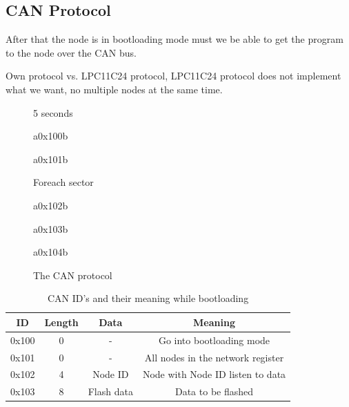 \documentclass[twocolumn]{article}
\begin{document}
	
	\subsection*{CAN Protocol}
		After that the node is in bootloading mode must we be able to get the program to the node over the CAN bus.
		
		
		Own protocol vs. LPC11C24 protocol, LPC11C24 protocol does not implement what we want, no multiple nodes at the same time.
		\begin{figure}[h]
			\centering
			\begin{sequencediagram}
				
				\begin{sdloop}{5 seconds}
					\begin{call}{a}{0x100}{b}{}
					\end{call}
				\end{sdloop}
				
				\begin{call}{a}{0x101}{b}{}
				\end{call}
				
				\begin{sdloop}{Foreach sector}
					\begin{call}{a}{0x102}{b}{} %
					\end{call}
				\end{sdloop}
				\begin{call}{a}{0x103}{b}{} %
				\end{call}
				\begin{call}{a}{0x104}{b}{} %
				\end{call}
				
				
			\end{sequencediagram}
			\caption{The CAN protocol}
		\end{figure}
		
		\begin{table}[ht]
			\caption{CAN ID's and their meaning while bootloading}
			
			\centering
			\begin{tabular}{|c|c|c|c|}
				\hline
				\textbf{ID} & \textbf{Length} & \textbf{Data} & \textbf{Meaning} \\ \hline
				0x100       & 0               & -             & Go into bootloading mode \\ \hline
				0x101       & 0               & -             & All nodes in the network register \\ \hline
				0x102       & 4               & Node ID       & Node with Node ID listen to data \\ \hline
				0x103       & 8               & Flash data    & Data to be flashed \\ \hline
			\end{tabular}
		\end{table}
	
\end{document}
